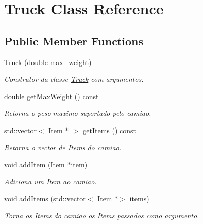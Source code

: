 \hypertarget{class_truck}{}\section{Truck Class Reference}
\label{class_truck}
\subsection*{Public Member Functions}
\begin{DoxyCompactItemize}
\item 
\hyperlink{class_truck_a2acdd2ee57218880d698eb672492bacf}{Truck} (double max\+\_\+weight)
\begin{DoxyCompactList}\small\item\em Construtor da classe \hyperlink{class_truck}{Truck} com argumentos. \end{DoxyCompactList}\item 
\hypertarget{class_truck_a01468485bc9c1b8bec475bca0828b109}{}\label{class_truck_a01468485bc9c1b8bec475bca0828b109} 
double \hyperlink{class_truck_a01468485bc9c1b8bec475bca0828b109}{get\+Max\+Weight} () const
\begin{DoxyCompactList}\small\item\em Retorna o peso maximo suportado pelo camiao. \end{DoxyCompactList}\item 
\hypertarget{class_truck_a356107b7e2cc09768e8da3f05e7a378e}{}\label{class_truck_a356107b7e2cc09768e8da3f05e7a378e} 
std\+::vector$<$ \hyperlink{class_item}{Item} $\ast$ $>$ \hyperlink{class_truck_a356107b7e2cc09768e8da3f05e7a378e}{get\+Items} () const
\begin{DoxyCompactList}\small\item\em Retorna o vector de Items do camiao. \end{DoxyCompactList}\item 
void \hyperlink{class_truck_aabd304715b197a343be89514f490dd55}{add\+Item} (\hyperlink{class_item}{Item} $\ast$item)
\begin{DoxyCompactList}\small\item\em Adiciona um \hyperlink{class_item}{Item} ao camiao. \end{DoxyCompactList}\item 
void \hyperlink{class_truck_a117a009f58f73401e923df180433d558}{add\+Items} (std\+::vector$<$ \hyperlink{class_item}{Item} $\ast$$>$ items)
\begin{DoxyCompactList}\small\item\em Torna os Items do camiao os Items passados como argumento. \end{DoxyCompactList}\item 
$$
\end{DoxyCompactItemize}
